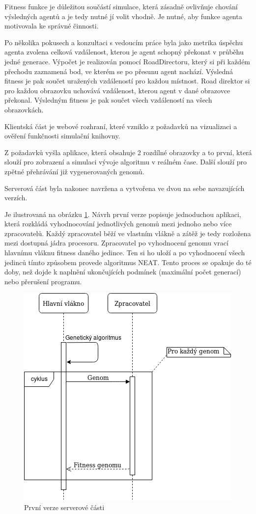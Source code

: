 Fitness funkce je důležitou součástí simulace, která zásadně ovlivňuje chování výsledných agentů a je tedy nutné jí volit vhodně. Je nutné, aby funkce agenta motivovala ke správné činnosti.

Po několika pokusech a konzultaci s vedoucím práce byla jako metrika úspěchu agenta zvolena celková vzdálenost, kterou je agent schopný překonat v průběhu jedné generace. Výpočet je realizován pomocí RoadDirectoru, který si při každém přechodu zaznamená bod, ve kterém se po přesunu agent nachází. Výsledná fitness je pak součet uražených vzdáleností pro každou místnost. Road direktor si pro každou obrazovku uchovává vzdálenost, kterou agent v dané obrazovce překonal. Výsledným fitness je pak součet všech vzdáleností na všech obrazovkách.

Klientská část je webové rozhraní, které vzniklo z požadavků na vizualizaci a ověření funkčnosti simulační knihovny. 

Z požadavků vyšla aplikace, která obsahuje 2 rozdílné obrazovky a to první, která slouží pro zobrazení a simulaci vývoje algoritmu v reálném čase. Další slouží pro zpětné přehrávání již vygenerovaných genomů.

Serverová část byla nakonec navržena a vytvořena ve dvou na sebe navazujících verzích. 

Je ilustrovaná na obrázku \ref{fig:server_first}. Návrh první verze popisuje jednoduchou aplikaci, která rozkládá vyhodnocování jednotlivých genomů mezi jednoho nebo více zpracovatelů. Každý zpracovatel běží ve vlastním vlákně a zátěž je tedy rozložena mezi dostupná jádra procesoru. Zpracovatel po vyhodnocení genomu vrací hlavnímu vláknu fitness daného jedince. Ten si ho uloží a po vyhodnocení všech jedinců tímto způsobem provede algoritmus NEAT. Tento proces se opakuje do té doby, než dojde k naplnění ukončujících podmínek (maximální počet generací) nebo přerušení programu.

\begin{figure}[H]
	\centering
	\includegraphics[width=0.7\linewidth]{server_first_use_case}
	\caption{První verze serverové části}
	\label{fig:server_first}
\end{figure}

